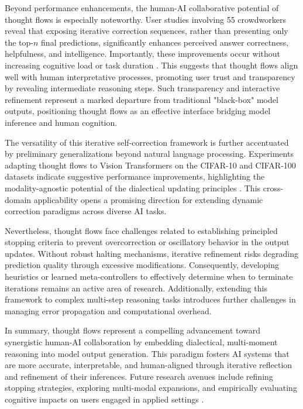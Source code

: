 \documentclass[sigconf]{acmart}
\begin{document}
Beyond performance enhancements, the human-AI collaborative potential of thought flows is especially noteworthy. User studies involving 55 crowdworkers reveal that exposing iterative correction sequences, rather than presenting only the top-$n$ final predictions, significantly enhances perceived answer correctness, helpfulness, and intelligence. Importantly, these improvements occur without increasing cognitive load or task duration \cite{ref43}. This suggests that thought flows align well with human interpretative processes, promoting user trust and transparency by revealing intermediate reasoning steps. Such transparency and interactive refinement represent a marked departure from traditional "black-box" model outputs, positioning thought flows as an effective interface bridging model inference and human cognition.

The versatility of this iterative self-correction framework is further accentuated by preliminary generalizations beyond natural language processing. Experiments adapting thought flows to Vision Transformers on the CIFAR-10 and CIFAR-100 datasets indicate suggestive performance improvements, highlighting the modality-agnostic potential of the dialectical updating principles \cite{ref43}. This cross-domain applicability opens a promising direction for extending dynamic correction paradigms across diverse AI tasks.

Nevertheless, thought flows face challenges related to establishing principled stopping criteria to prevent overcorrection or oscillatory behavior in the output updates. Without robust halting mechanisms, iterative refinement risks degrading prediction quality through excessive modifications. Consequently, developing heuristics or learned meta-controllers to effectively determine when to terminate iterations remains an active area of research. Additionally, extending this framework to complex multi-step reasoning tasks introduces further challenges in managing error propagation and computational overhead.

In summary, thought flows represent a compelling advancement toward synergistic human-AI collaboration by embedding dialectical, multi-moment reasoning into model output generation. This paradigm fosters AI systems that are more accurate, interpretable, and human-aligned through iterative reflection and refinement of their inferences. Future research avenues include refining stopping strategies, exploring multi-modal expansions, and empirically evaluating cognitive impacts on users engaged in applied settings \cite{ref43}.
\end{document}
